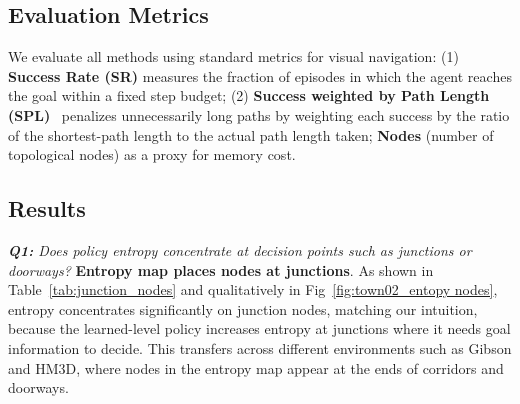 \subsection{Evaluation Metrics}
We evaluate all methods using standard metrics for visual navigation: (1) \textbf{Success Rate (SR)} measures the fraction of episodes in which the agent reaches the goal within a fixed step budget; (2) \textbf{Success weighted by Path Length (SPL)}~\cite{anderson2018evaluation} penalizes unnecessarily long paths by weighting each success by the ratio of the shortest-path length to the actual path length taken; \textbf{Nodes} (number of topological nodes) as a
proxy for memory cost.

\subsection{Results}
\label{sec:results}
\textit{\textbf{Q1:} Does policy entropy concentrate at decision points such as
junctions or doorways?}
\textbf{Entropy map places nodes at junctions}.
As shown in Table~\ref{tab:junction_nodes} and qualitatively in Fig~\ref{fig:town02_entopy nodes}, entropy concentrates significantly on junction nodes, matching our intuition, because the learned-level policy increases entropy at junctions where it needs goal information to decide. This transfers across different environments such as Gibson and HM3D, where nodes in the entropy map appear at the ends of corridors and doorways.

